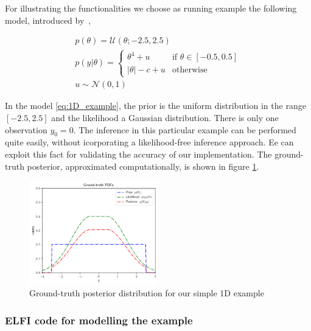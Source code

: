 For illustrating the functionalities we choose as running
example the following model, introduced by~\autocite{Ikonomov2019},

\begin{gather} \label{eq:1D_example}
  p(\theta) = \mathcal{U}(\theta;-2.5,2.5)\\
  p(y|\theta) = 
  \left\{
    \begin{array}{ll}
      \theta^4 + u & \mbox{if } \theta \in [-0.5, 0.5] \\
      |\theta| - c + u & \mbox{otherwise} 
    \end{array} \right.\\
  u \sim \mathcal{N}(0,1)
\end{gather}

\noindent

In the model \eqref{eq:1D_example}, the prior is the uniform
distribution in the range $[-2.5, 2.5]$ and the likelihood a Gaussian
distribution. There is only one observation $y_0 = 0$. The inference
in this particular example can be performed quite easily, without
icorporating a likelihood-free inference approach. Ee can exploit this
fact for validating the accuracy of our implementation. The
ground-truth posterior, approximated computationally, is shown in
figure \ref{fig:example_gt}.

\begin{figure}[h]
    \begin{center}
      \includegraphics[width=0.5\textwidth]{./Thesis/images/chapter3/example_gt.png}
    \end{center}
  \caption{Ground-truth posterior distribution for our simple 1D example}
  \label{fig:example_gt}
\end{figure}

\subsubsection*{ELFI code for modelling the example}

